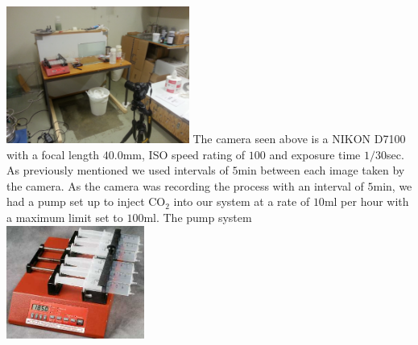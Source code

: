 \documentclass[twoside]{article}
\begin{document}
\begin{multicols}{2}
\includegraphics[width=0.45\textwidth]{setup.jpg}\label{fig:setup}
\vspace{0.3cm}
The camera seen above is a NIKON D7100 with a focal length $40.0$mm, ISO speed rating of $100$ and exposure time $1/30$sec. As previously mentioned we used intervals of $5$min between each image taken by the camera. As the camera was recording the process with an interval of $5$min, we had a pump set up to inject CO$_2$ into our system at a rate of $10$ml per hour with a maximum limit set to $100$ml. The pump system \\

\includegraphics[width=0.34\textwidth]{pump.jpg}\label{fig:pump}


\end{multicols}
\end{document}
